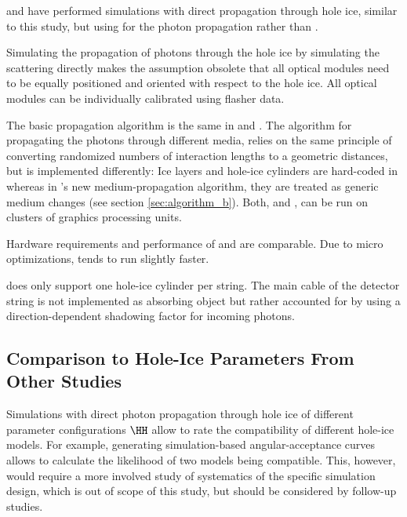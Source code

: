 \chirkin and \rongen have performed simulations with direct propagation through hole ice, similar to this study, but using \ppc for the photon propagation rather than \clsim. \cite{martinspicehddard}\cite{martindardupdate}\cite{pocam}\cite{icrc17pocam}\cite{ppcpaper}


Simulating the propagation of photons through the hole ice by simulating the scattering directly makes the assumption obsolete that all optical modules need to be equally positioned and oriented with respect to the hole ice. All optical modules can be individually calibrated using flasher data. \cite{martinspicehddard}

The basic propagation algorithm is the same in \ppc and \clsim. The algorithm for propagating the photons through different media, relies on the same principle of converting randomized numbers of interaction lengths to a geometric distances, but is implemented differently: Ice layers and hole-ice cylinders are hard-coded in \ppc whereas in \clsim's new medium-propagation algorithm, they are treated as generic medium changes (see section \ref{sec:algorithm_b}). Both, \ppc and \clsim, can be run on clusters of graphics processing units.

Hardware requirements and performance of \ppc and \clsim are comparable. Due to micro optimizations, \ppc tends to run slightly faster. \mref{}

\ppc does only support one hole-ice cylinder per string. The main cable of the detector string is not implemented as absorbing object but rather accounted for by using a direction-dependent shadowing factor for incoming photons. \cite{ppcsource}\cite{ppcforhumans}


\subsection{Comparison to Hole-Ice Parameters From Other Studies}
\label{sec:angular_acceptance_comparison}\label{sec:parameter_comparison}


\newcommand\ok{\ding{51}} %
\newcommand\same{\cellcolor{black!25}}
\newcommand\greyedout{\cellcolor{black!25}}
\newcommand\bad{\ding{55}}

Simulations with direct photon propagation through hole ice of different parameter configurations $\HH$ allow to rate the compatibility of different hole-ice models. For example, generating simulation-based angular-acceptance curves allows to calculate the likelihood of two models being compatible. This, however, would require a more involved study of systematics of the specific simulation design, which is out of scope of this study, but should be considered by follow-up studies.\followup

